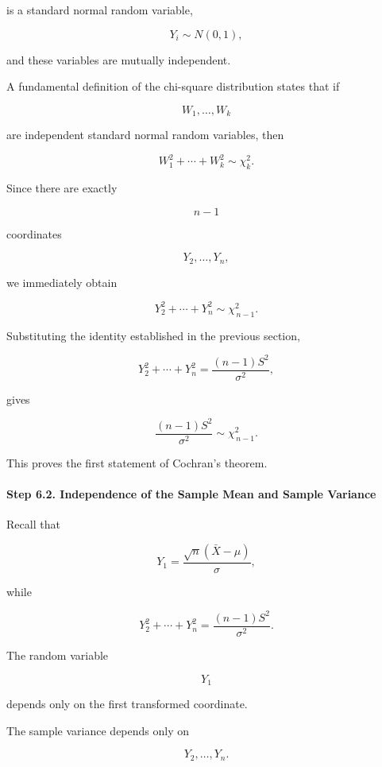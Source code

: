 \documentclass[11pt]{article}
\begin{document}
\begin{mdframed}[
		linewidth=0.8pt,
		roundcorner=6pt,
		backgroundcolor=gray!5,
		linecolor=gray!60,
		innertopmargin=10pt,
		innerbottommargin=10pt,
		innerleftmargin=10pt,
		innerrightmargin=10pt
		]
		is a standard normal random variable,
		
		\[
		Y_i
		\sim
		N(0,1),
		\]
		
		and these variables are mutually independent.
		
		A fundamental definition of the chi-square distribution states that if
		
		\[
		W_1,\ldots,W_k
		\]
		
		are independent standard normal random variables, then
		
		\[
		W_1^2+\cdots+W_k^2
		\sim
		\chi_k^2.
		\]
		
		Since there are exactly
		
		\[
		n-1
		\]
		
		coordinates
		
		\[
		Y_2,\ldots,Y_n,
		\]
		
		we immediately obtain
		
		\[
		\boxed{
			Y_2^2+\cdots+Y_n^2
			\sim
			\chi_{\,n-1}^2.
		}
		\]
		
		Substituting the identity established in the previous section,
		
		\[
		Y_2^2+\cdots+Y_n^2
		=
		\frac{(n-1)S^2}{\sigma^2},
		\]
		
		gives
		
		\[
		\boxed{
			\frac{(n-1)S^2}{\sigma^2}
			\sim
			\chi_{\,n-1}^2.
		}
		\]
		
		This proves the first statement of Cochran's theorem.
		
		\vspace{0.3cm}
		
		\paragraph{Step 6.2. Independence of the Sample Mean and Sample Variance}
		
		Recall that
		
		\[
		Y_1
		=
		\frac{\sqrt n(\bar X-\mu)}
		{\sigma},
		\]
		
		while
		
		\[
		Y_2^2+\cdots+Y_n^2
		=
		\frac{(n-1)S^2}{\sigma^2}.
		\]
		
		The random variable
		
		\[
		Y_1
		\]
		
		depends only on the first transformed coordinate.
		
		The sample variance depends only on
		
		\[
		Y_2,\ldots,Y_n.
		\]
		

\end{mdframed}
\end{document}
